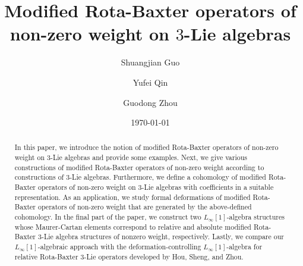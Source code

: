 \documentclass[12pt]{amsart}
\theoremstyle{definition}
\begin{document}
\title [Modified Rota-Baxter operators]{Modified Rota-Baxter operators of non-zero weight on $3$-Lie algebras}

\author{Shuangjian Guo}
\address{(Shuangjian Guo)
 School of Mathematics and Statistics, Guizhou University of Finance and Economics, Guizhou 550025, P. R. of China}

\author{Yufei Qin}
\address{(Yufei Qin)   School of Mathematical Sciences \\ Key Laboratory of MEA (Ministry of Education)\\ Shanghai Key laboratory of PMMP\\	East China Normal University\\	Shanghai 200241,	P. R. of China}
     \address{Department of Mathematics and Data Science\\ Vrije Universiteit Brussel\\ Pleinlaan 2, 1050 Brussels\\ Belgium }



\author{Guodong Zhou}
\address{(Guodong Zhou) School of Mathematical Sciences,  Shanghai Key Laboratory of PMMP,  East China Normal University, Shanghai 200241, P. R. of China}


\date{\today}


\begin{abstract}
In this paper, we introduce the notion of  modified Rota-Baxter
operators of non-zero weight on $3$-Lie algebras  and provide some examples. Next,  we give various constructions of modified Rota-Baxter
operators of non-zero weight  according to constructions of $3$-Lie algebras.  Furthermore,   we define a cohomology of  modified Rota-Baxter
operators of non-zero weight  on $3$-Lie algebras with coefficients in a suitable representation.   As an application, we study formal deformations of modified Rota-Baxter
operators of non-zero weight  that are generated by the above-defined cohomology. In the final part of the paper, we construct two \(L_\infty[1]\)-algebra structures whose Maurer-Cartan elements correspond to relative and absolute modified Rota-Baxter \(3\)-Lie algebra structures of nonzero weight, respectively. Lastly, we compare our \(L_\infty[1]\)-algebraic approach with the deformation-controlling \(L_\infty[1]\)-algebra for relative Rota-Baxter \(3\)-Lie operators developed by Hou, Sheng, and Zhou.

\end{abstract}
\end{document}
